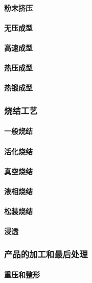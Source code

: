 \documentclass[UTF8]{../../ApplicationUniverse}
\begin{document}
            \paragraph{粉末挤压}
            \paragraph{无压成型}
            \paragraph{高速成型}
            \paragraph{热压成型}
            \paragraph{热锻成型}
        \subsubsection{烧结工艺}
            \paragraph{一般烧结}
            \paragraph{活化烧结}
            \paragraph{真空烧结}
            \paragraph{液相烧结}
            \paragraph{松装烧结}
            \paragraph{浸透}
        \subsubsection{产品的加工和最后处理}
            \paragraph{重压和整形}
\end{document}
